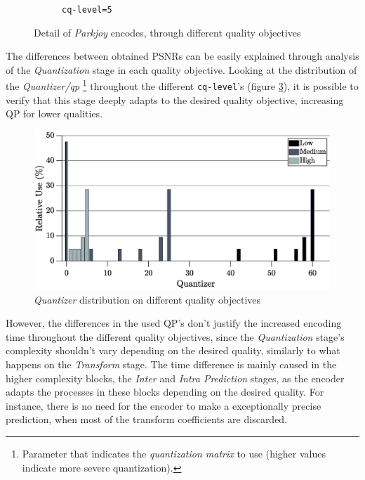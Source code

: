\begin{figure}[!htpb]
\begin{subfigure}[c]{\textwidth}
            \caption{\texttt{cq-level=5}}
            \label{subfig:highq}
        \end{subfigure}
        \caption{Detail of \emph{Parkjoy} encodes, through different quality objectives}
    \label{fig:qdiffs}
\end{figure}

The differences between obtained PSNRs can be easily explained through analysis of the \emph{Quantization} stage in each quality objective. Looking at the distribution of the \emph{Quantizer/\Gls{qp}} 
\footnote{Parameter that indicates the \emph{quantization matrix} to use (higher values indicate more severe quantization).}
throughout the different \texttt{cq-level}'s (figure \ref{fig:quantavg}), it is possible to verify that this stage deeply adapts to the desired quality objective, increasing QP for lower qualities. 

\begin{figure}[!htpb]
    \centering
    \includegraphics[width=\textwidth]{Sections/3Transforms/Images/quantizerAvg.eps}
    \caption{\emph{Quantizer} distribution on different quality objectives}
    \label{fig:quantavg}
\end{figure}

However, the differences in the used QP's don't justify the increased encoding time throughout the different quality objectives, since the \emph{Quantization} stage's complexity shouldn't vary depending on the desired quality, similarly to what happens on the \emph{Transform} stage. The time difference is mainly caused in the higher complexity blocks, the \emph{Inter} and \emph{Intra Prediction} stages, as the encoder adapts the processes in these blocks depending on the desired quality. For instance, there is no need for the encoder to make a exceptionally precise prediction, when most of the transform coefficients are discarded.

